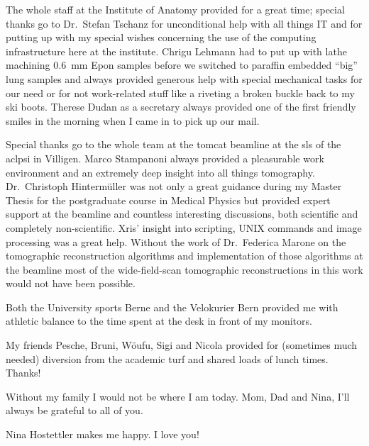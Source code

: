 The whole staff at the Institute of Anatomy provided for a great time; special thanks go to Dr.\ Stefan Tschanz for unconditional help with all things IT and for putting up with my special wishes concerning the use of the computing infrastructure here at the institute. Chrigu Lehmann had to put up with lathe machining \SI{0.6}{\milli\meter} Epon samples before we switched to paraffin embedded ``big'' lung samples and always provided generous help with special mechanical tasks for our need or for not work-related stuff like a riveting a broken buckle back to my ski boots. Therese Dudan as a secretary always provided one of the first friendly smiles in the morning when I came in to pick up our mail.

Special thanks go to the whole team at the \acs{tomcat} beamline at the \acl{sls} of the acl{psi} in Villigen. Marco Stampanoni always provided a pleasurable work environment and an extremely deep insight into all things tomography. Dr.\ Christoph Hintermüller was not only a great guidance during my Master Thesis for the postgraduate course in Medical Physics but provided expert support at the beamline and countless interesting discussions, both scientific and completely non-scientific. Xris' insight into scripting, UNIX commands and image processing was a great help. Without the work of Dr.\ Federica Marone on the tomographic reconstruction algorithms and implementation of those algorithms at the beamline most of the wide-field-scan tomographic reconstructions in this work would not have been possible.

Both the University sports Berne and the Velokurier Bern provided me with athletic balance to the time spent at the desk in front of my monitors.

My friends Pesche, Bruni, Wöufu, Sigi and Nicola provided for (sometimes much needed) diversion from the academic turf and shared loads of lunch times. Thanks!

Without my family I would not be where I am today. Mom, Dad and Nina, I'll always
be grateful to all of you.

Nina  Hostettler makes me happy. I love you!
\endgroup